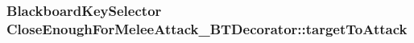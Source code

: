 \subsubsection[{\texorpdfstring{target\+To\+Attack}{targetToAttack}}]{\setlength{\rightskip}{0pt plus 5cm}Blackboard\+Key\+Selector Close\+Enough\+For\+Melee\+Attack\+\_\+\+B\+T\+Decorator\+::target\+To\+Attack}\hypertarget{class_close_enough_for_melee_attack___b_t_decorator_a282f26ed267baec9c049ccebc61f767e}{}\label{class_close_enough_for_melee_attack___b_t_decorator_a282f26ed267baec9c049ccebc61f767e}
